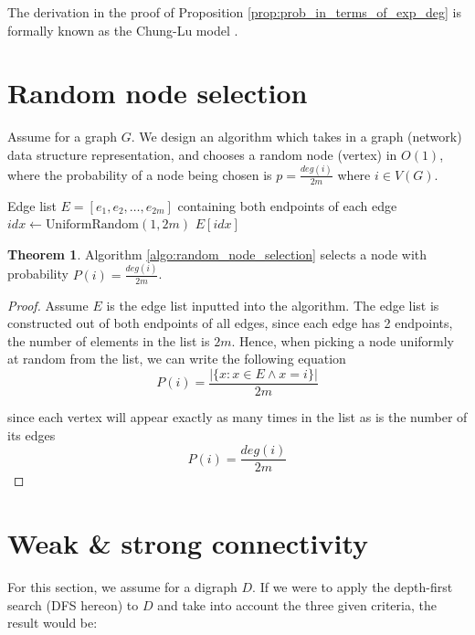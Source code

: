 \documentclass[12pt]{article}
\theoremstyle{definition}
\newtheorem{theorem}{Theorem}
\begin{document}
The derivation in the proof of Proposition \ref{prop:prob_in_terms_of_exp_deg} is formally known as the Chung-Lu model \cite{chung2002connected}.


\section{Random node selection}

Assume for a graph $G$. We design an algorithm which takes in a graph (network) data structure representation, and chooses a random node (vertex) in $O(1)$, where the probability of a node being chosen is $p = \frac{deg(i)}{2m}$ where $i \in V(G)$.

\begin{algorithm}[H]
  \label{algo:random_node_selection}
  \caption{Degree-proportional node selection}
  \begin{algorithmic}[1]
    \Require Edge list $E = [e_1, e_2, \ldots, e_{2m}]$ containing both endpoints of each edge
    \State $idx \gets \text{UniformRandom}(1, 2m)$
    \State \Return $E[idx]$
  \end{algorithmic}
\end{algorithm}

\begin{theorem}
  Algorithm \ref{algo:random_node_selection} selects a node with probability $P(i) = \frac{deg(i)}{2m}$.
\end{theorem}

\begin{proof}
  Assume $E$ is the edge list inputted into the algorithm. The edge list is constructed out of both endpoints of all edges, since each edge has 2 endpoints, the number of elements in the list is $2m$.
  \noindent
  Hence, when picking a node uniformly at random from the list, we can write the following equation
  \[
    P(i) = \frac{|\{x: x\in E \wedge x = i\}|}{2m}
  \]

  \noindent
  since each vertex will appear exactly as many times in the list as is the number of its edges
  \[
    P(i) = \frac{deg(i)}{2m}
  \]
\end{proof}

\newpage
\section{Weak \& strong connectivity}

For this section, we assume for a digraph $D$. If we were to apply the depth-first search (DFS hereon) to $D$ and take into account the three given criteria, the result would be:
\end{document}
